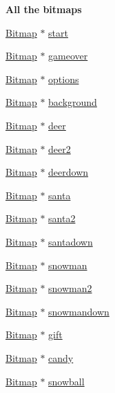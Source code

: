 \begin{Indent}\textbf{ All the bitmaps}\par
\begin{DoxyCompactItemize}
\item 
\hyperlink{struct_bitmap}{Bitmap} $\ast$ \hyperlink{struct_game_ad50c72d4974332bda06a2cd6831b2175}{start}
\item 
\hyperlink{struct_bitmap}{Bitmap} $\ast$ \hyperlink{struct_game_a41402ca6fb41d3af66d2db9dac02cc23}{gameover}
\item 
\hyperlink{struct_bitmap}{Bitmap} $\ast$ \hyperlink{struct_game_aa6717db7288a48453552a20746f11644}{options}
\item 
\hyperlink{struct_bitmap}{Bitmap} $\ast$ \hyperlink{struct_game_a15de70574bc710486bf129a5c8f1634e}{background}
\item 
\hyperlink{struct_bitmap}{Bitmap} $\ast$ \hyperlink{struct_game_a8b5c5b1b81938802ce28261a7bcd6121}{deer}
\item 
\hyperlink{struct_bitmap}{Bitmap} $\ast$ \hyperlink{struct_game_a21ba575fc78f37cb0ff57a7bccee35a3}{deer2}
\item 
\hyperlink{struct_bitmap}{Bitmap} $\ast$ \hyperlink{struct_game_a33b47a9a25fd7e1f26bfdc65ec24878f}{deerdown}
\item 
\hyperlink{struct_bitmap}{Bitmap} $\ast$ \hyperlink{struct_game_add8cae6a79535ad03e93471b7fa8966f}{santa}
\item 
\hyperlink{struct_bitmap}{Bitmap} $\ast$ \hyperlink{struct_game_a659095d2d4fbfc3a0e6cfefed6c9df67}{santa2}
\item 
\hyperlink{struct_bitmap}{Bitmap} $\ast$ \hyperlink{struct_game_a8e2568ac990bf65b346207c38f9b9d30}{santadown}
\item 
\hyperlink{struct_bitmap}{Bitmap} $\ast$ \hyperlink{struct_game_ad7f286c4db8aaad603a752019e0f4505}{snowman}
\item 
\hyperlink{struct_bitmap}{Bitmap} $\ast$ \hyperlink{struct_game_ad79926ad94ec835810bb1f561add7cb3}{snowman2}
\item 
\hyperlink{struct_bitmap}{Bitmap} $\ast$ \hyperlink{struct_game_adee299bb7d3192b93398a37623c7d7b8}{snowmandown}
\item 
\hyperlink{struct_bitmap}{Bitmap} $\ast$ \hyperlink{struct_game_a78e9340cc0b28cd18c981daa6cb4bbcf}{gift}
\item 
\hyperlink{struct_bitmap}{Bitmap} $\ast$ \hyperlink{struct_game_a348b1dd54ea8a2a753876f57734af5fe}{candy}
\item 
\hyperlink{struct_bitmap}{Bitmap} $\ast$ \hyperlink{struct_game_a0863074f198120542c675bd18f611557}{snowball}

\end{DoxyCompactItemize}
\end{Indent}
